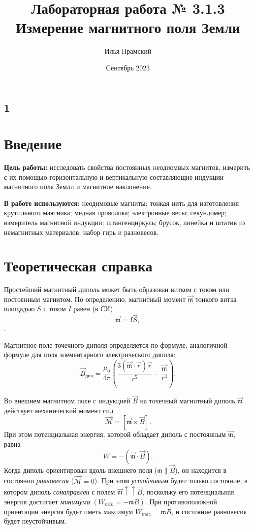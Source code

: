 \documentclass[a4paper,12pt]{article}
\title{Лабораторная работа № 3.1.3\\Измерение магнитного поля Земли}
\author{Илья Прамский}
\date{Сентябрь 2023}
\begin{document}
\maketitle
\newpage
\subsection*{1}
\vspace{5mm}
\section*{Введение}

\begin{flushleft}
  \textbf{Цель работы:} исследовать свойства постоянных неодиомвых магнитов, измерить с их помощью горизонтальную и вертикальную составляющие индукции магнитного поля Земли и магнитное наклонение.

\end{flushleft}

\begin{flushleft}
  \textbf{В работе используются:} неодимовые магниты; тонкая нить для изготовления крутильного маятника; медная проволока; электронные весы; секундомер; измеритель магнитной индукции; штангенциркуль; брусок, линейка и штатив из немагнитных материалов; набор гирь и разновесов.

\end{flushleft}

\section*{Теоретическая справка}

Простейший магнитный диполь может быть образован витком с током или постоянным магнитом. По определению, магнитный момент $\vec{\mathfrak{m}}$ тонкого витка площадью $S$ с током $I$ равен (в СИ)\[\vec{\mathfrak{m}}=I\vec{S},\].

Магнитное поле точечного диполя определяется по формуле, аналогичной формуле для поля элементарного электрического диполя:\[\vec{B}_{\text{дип}}=\frac{\mu_0}{4\pi}\left(\frac{3\left(\vec{\mathfrak{m}}\cdot\vec{r}\right)\vec{r}}{r^5}-\frac{\vec{\mathfrak{m}}}{r^3}\right).\]

Во внешнем магнитном поле с индукцией $\vec{B}$ на точечный магнитный диполь $\vec{\mathfrak{m}}$ действует механический момент сил\[\vec{\mathcal{M}}=\left[\vec{\mathfrak{m}}\times\vec{B}\right].\]При этом потенциальная энергия, которой обладает диполь с постоянным $\vec{\mathfrak{m}}$, равна\[W=-\left(\vec{\mathfrak{m}}\cdot\vec{B}\right).\]Когда диполь ориентирован вдоль внешнего поля ($\mathfrak{m}\parallel\vec{B}$), он находится в состоянии \textit{равновесия} ($\vec{\mathcal{M}}=0$). При этом \textit{устойчивым} будет только состояние, в котором диполь \textit{сонаправлен} с полем $\vec{\mathfrak{m}}\uparrow\uparrow\vec{B}$, поскольку его потенциальная энергия достигает \textit{минимума} $(W_{min}=-\mathfrak{m}B)$. При противоположной ориентации энергия будет иметь максимум $W_{max}=\mathfrak{m}B$, и состояние равновесия будет неустойчивым.
\end{document}
